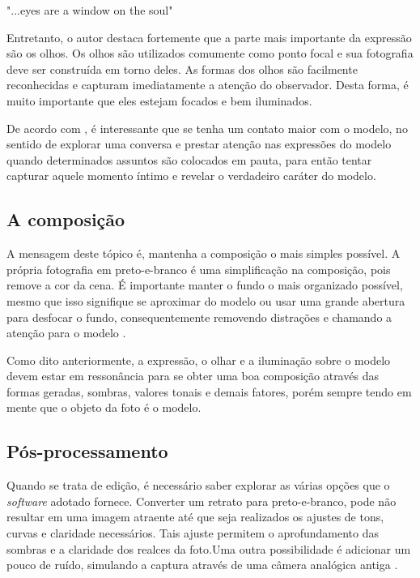 \documentclass[
	article,			%
	12pt,				%
	oneside,			%
	a4paper,			%
	english,			%
	brazil,				%
	sumario=tradicional
	]{abntex2}
\begin{document}
\begin{citacao}
	"...eyes are a window on the soul" 
\end{citacao}

Entretanto, o autor destaca fortemente que a parte mais importante da expressão são os olhos. Os olhos são utilizados comumente como ponto focal e sua fotografia deve ser construída em torno deles. As formas dos olhos são facilmente reconhecidas e capturam imediatamente a atenção do observador. Desta forma, é muito importante que eles estejam focados e bem iluminados.

De acordo com , é interessante que se tenha um contato maior com o modelo, no sentido de explorar uma conversa e prestar atenção nas expressões do modelo quando determinados assuntos são colocados em pauta, para então tentar capturar aquele momento íntimo e revelar o verdadeiro caráter do modelo.

\subsection{A composição}

A mensagem deste tópico é, mantenha a composição o mais simples possível. A própria fotografia em preto-e-branco é uma simplificação na composição, pois remove a cor da cena. É importante manter o fundo o mais organizado possível, mesmo que isso signifique se aproximar do modelo ou usar uma grande abertura para desfocar o fundo, consequentemente removendo distrações e chamando a atenção para o modelo \cite{SITE5TIPS}.

Como dito anteriormente, a expressão, o olhar e a iluminação sobre o modelo devem estar em ressonância para se obter uma boa composição através das formas geradas, sombras, valores tonais e demais fatores, porém sempre tendo em mente que o objeto da foto é o modelo.

\subsection{Pós-processamento}

Quando se trata de edição, é necessário saber explorar as várias opções que o \textit{software} adotado fornece. Converter um retrato para preto-e-branco, pode não resultar em uma imagem atraente até que seja realizados os ajustes de tons, curvas e claridade necessários. Tais ajuste permitem o aprofundamento das sombras e a claridade dos realces da foto.Uma outra possibilidade é adicionar um pouco de ruído, simulando a captura através de uma câmera analógica antiga \cite{SITEEXPERT}.
\end{document}
